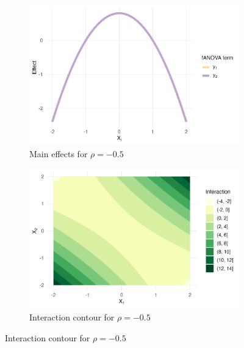 \begin{figure}[htpb]
    \centering
    \begin{subfigure}[t]{0.49\textwidth}
        \centering
        \includegraphics[width=\textwidth]{images/experiment_section/interaction_a1p00_a2p00_a11p00_a22p00_a12p20_rhom05_main.png}
        \caption{Main effects for $\rho = -0.5$}
    \end{subfigure}%
    \hfill
    \begin{subfigure}[t]{0.49\textwidth}
        \centering
        \includegraphics[width=\textwidth]{images/experiment_section/interaction_a1p00_a2p00_a11p00_a22p00_a12p20_rhom05_interaction.png}
        \caption{Interaction contour for $\rho = -0.5$}
    \end{subfigure}


\end{figure}
